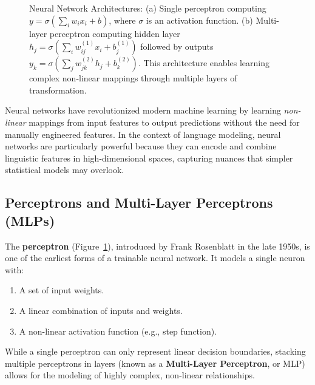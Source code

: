 \begin{figure}[htbp]
\caption{Neural Network Architectures: (a) Single perceptron computing $y = \sigma(\sum_{i} w_i x_i + b)$, where $\sigma$ is an activation function. 
(b) Multi-layer perceptron computing hidden layer $h_j = \sigma(\sum_{i} w^{(1)}_{ij} x_i + b^{(1)}_j)$ followed by outputs 
$y_k = \sigma(\sum_{j} w^{(2)}_{jk} h_j + b^{(2)}_k)$. This architecture enables learning complex non-linear mappings through multiple layers of transformation.}
\label{fig:neural_architectures}
\end{figure}

\noindent
Neural networks have revolutionized modern machine learning by learning \emph{non-linear} mappings from input features to output predictions without the need for manually engineered features. In the context of language modeling, neural networks are particularly powerful because they can encode and combine linguistic features in high-dimensional spaces, capturing nuances that simpler statistical models may overlook.

\subsection{Perceptrons and Multi-Layer Perceptrons (MLPs)}
\noindent
The \textbf{perceptron} (Figure~\ref{fig:neural_architectures}), introduced by Frank Rosenblatt in the late 1950s, is one of the earliest forms of a trainable neural network. It models a single neuron with:
\begin{enumerate}
    \item A set of input weights.
    \item A linear combination of inputs and weights.
    \item A non-linear activation function (e.g., step function).
\end{enumerate}
While a single perceptron can only represent linear decision boundaries, stacking multiple perceptrons in layers (known as a \textbf{Multi-Layer Perceptron}, or MLP) allows for the modeling of highly complex, non-linear relationships.

